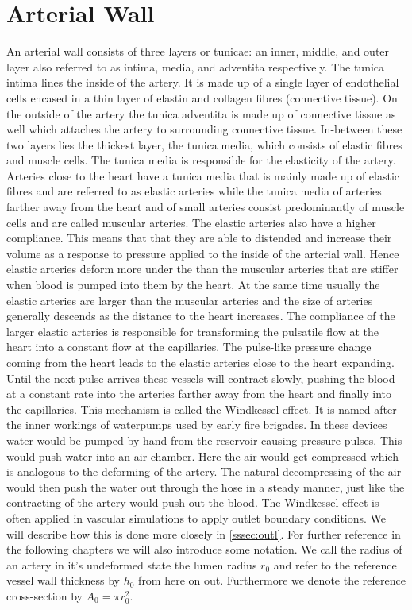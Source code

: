 \documentclass[a4paper, oneside]{discothesis}
\begin{document}
\section{Arterial Wall} \label{aw}
An arterial wall consists of three layers or tunicae: an inner, middle, and outer layer also referred to as intima, media, and adventita respectively.
The tunica intima lines the inside of the artery. It is made up of a single layer of endothelial cells encased in a thin layer of elastin and collagen fibres (connective tissue). 
On the outside of the artery the tunica adventita is made up of connective tissue as well which attaches the artery to surrounding connective tissue.
In-between these two layers lies the thickest layer, the tunica media, which consists of elastic fibres and muscle cells. 
The tunica media is responsible for the elasticity of the artery.
Arteries close to the heart have a tunica media that is mainly made up of elastic fibres and are referred to as elastic arteries while the tunica media of arteries farther away from the heart and of small arteries consist predominantly of muscle cells and are called muscular arteries.
The elastic arteries also have a higher compliance.
This means that that they are able to distended and increase their volume as a response to pressure applied to the inside of the arterial wall.
Hence elastic arteries deform more under the than the muscular arteries that are stiffer when blood is pumped into them by the heart.
At the same time usually the elastic arteries are larger than the muscular arteries and the size of arteries generally descends as the distance to the heart increases.
The compliance of the larger elastic arteries is responsible for transforming the pulsatile flow at the heart into a constant flow at the capillaries.
The pulse-like pressure change coming from the heart leads to the elastic arteries close to the heart expanding.
Until the next pulse arrives these vessels will contract slowly, pushing the blood at a constant rate into the arteries farther away from the heart and finally into the capillaries.
This mechanism is called the Windkessel effect.
It is named after the inner workings of waterpumps used by early fire brigades.
In these devices water would be pumped by hand from the reservoir causing pressure pulses.
This would push water into an air chamber.
Here the air would get compressed which is analogous to the deforming of the artery.
The natural decompressing of the air would then push the water out through the hose in a steady manner, just like the contracting of the artery would push out the blood.
The Windkessel effect is often applied in vascular simulations to apply outlet boundary conditions.
We will describe how this is done more closely in \autoref{sssec:outl}.
For further reference in the following chapters we will also introduce some notation.
We call the radius of an artery in it's undeformed state the lumen radius $r_0$ and refer to the reference vessel wall thickness by $h_0$ from here on out.
Furthermore we denote the reference cross-section by $A_0 = \pi r_0^2$.
\end{document}
